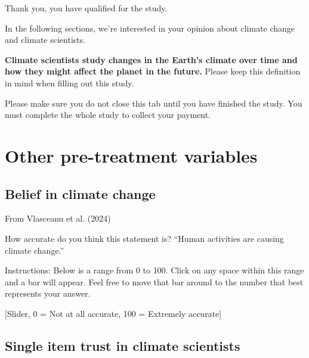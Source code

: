 \documentclass[
  letterpaper,
  DIV=11,
  numbers=noendperiod]{scrartcl}
\begin{document}
Thank you, you have qualified for the study.

In the following sections, we're interested in your opinion about
climate change and climate scientists.

\textbf{Climate scientists study changes in the Earth's climate over
time and how they might affect the planet in the future.} Please keep
this definition in mind when filling out this study.

Please make sure you do not close this tab until you have finished the
study. You must complete the whole study to collect your payment.

\section{Other pre-treatment
variables}\label{other-pre-treatment-variables}

\subsection{Belief in climate change}\label{belief-in-climate-change}

\begin{tcolorbox}[enhanced jigsaw, toprule=.15mm, toptitle=1mm, colframe=quarto-callout-note-color-frame, leftrule=.75mm, rightrule=.15mm, bottomtitle=1mm, coltitle=black, colbacktitle=quarto-callout-note-color!10!white, bottomrule=.15mm, breakable, opacityback=0, titlerule=0mm, title=\textcolor{quarto-callout-note-color}{\faInfo}\hspace{0.5em}{Note}, left=2mm, arc=.35mm, opacitybacktitle=0.6, colback=white]

From Vlasceanu et al. (2024)

\end{tcolorbox}

How accurate do you think this statement is? ``Human activities are
causing climate change.''

Instructions: Below is a range from 0 to 100. Click on any space within
this range and a bar will appear. Feel free to move that bar around to
the number that best represents your answer.

{[}Slider, 0 = Not at all accurate, 100 = Extremely accurate{]}

\subsection{Single item trust in climate
scientists}\label{single-item-trust-in-climate-scientists}
\end{document}
